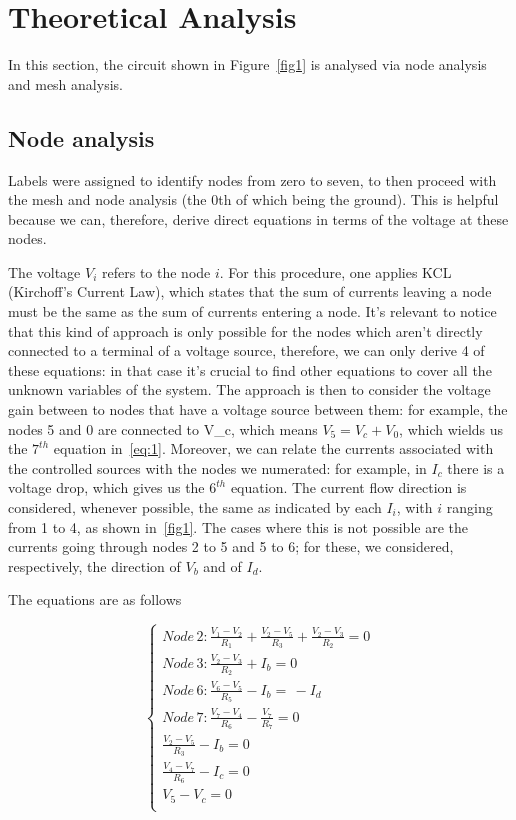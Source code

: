 \section{Theoretical Analysis}
\label{sec:analysis}

In this section, the circuit shown in Figure~\ref{fig1} is analysed via node analysis and mesh analysis.

\subsection{Node analysis}



Labels were assigned to identify nodes from zero to seven, to then proceed with the mesh and node analysis (the 0th of which being the ground). This is helpful because we can, therefore, derive direct equations in terms of the voltage at these nodes.

The voltage $V_i$ refers to the node $i$. For this procedure, one applies KCL (Kirchoff's Current Law), which states that the sum of currents leaving a node must be the same as the sum of currents entering a node. It's relevant to notice that this kind of approach is only possible for the nodes which aren't directly connected to a terminal of a voltage source, therefore, we can only derive 4 of these equations: in that case it's crucial to find other equations to cover all the unknown variables of the system. The approach is then to consider the voltage gain between to nodes that have a voltage source between them: for example, the nodes 5 and 0 are connected to V_c, which means $V_5 = V_c + V_0$, which wields us the $7^{th}$ equation in~\ref{eq:1}. Moreover, we can relate the currents associated with the controlled sources with the nodes we numerated: for example, in $I_c$ there is a voltage drop, which gives us the $6^{th}$ equation.
The current flow direction is considered, whenever possible, the same as indicated by each $I_i$, with $i$ ranging from 1 to 4, as shown in~\ref{fig1}. The cases where this is not possible are the currents going through nodes 2 to 5 and 5 to 6; for these, we considered, respectively, the direction of $V_b$ and of $I_d$.

The equations are as follows

\begin{equation} 
\begin{cases}  
    Node\, 2: \frac{V_1 - V_2}{R_1} + \frac{V_2 - V_5}{R_3} + \frac{V_2 - V_3}{R_2} = 0 \\
    Node\, 3: \frac{V_2 - V_3}{R_2} + I_b = 0 \\
    Node\, 6: \frac{V_6 - V_5}{R_5} - I_b = \,  - I_d \\
    Node\, 7: \frac{V_7 - V_4}{R_6} - \frac{V_7}{R_7} = 0 \\
    \frac{V_2 - V_5}{R_3} - I_b = 0 \\
    \frac{V_4 - V_7}{R_6} - I_c = 0\\
    V_5 - V_c = 0\\
\end{cases}
\label{eq:1}
\end{equation}

